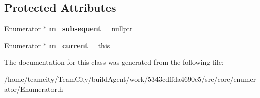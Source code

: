\subsection*{Protected Attributes}
\begin{DoxyCompactItemize}
\item 
\hyperlink{classEnumerator}{Enumerator} $\ast$ {\bfseries m\+\_\+subsequent} = nullptr\hypertarget{classEnumerator_a1535fa29c9f144d93bd47c0be150f45e}{}\label{classEnumerator_a1535fa29c9f144d93bd47c0be150f45e}

\item 
\hyperlink{classEnumerator}{Enumerator} $\ast$ {\bfseries m\+\_\+current} = this\hypertarget{classEnumerator_af6d7d831ebd1fb133a0ea91f60e776fd}{}\label{classEnumerator_af6d7d831ebd1fb133a0ea91f60e776fd}

\end{DoxyCompactItemize}


The documentation for this class was generated from the following file\+:\begin{DoxyCompactItemize}
\item 
/home/teamcity/\+Team\+City/build\+Agent/work/5343cdffda4690e5/src/core/enumerator/Enumerator.\+h\end{DoxyCompactItemize}
